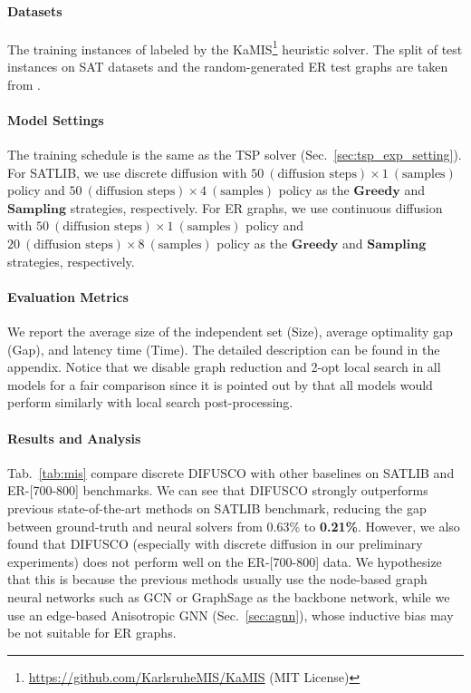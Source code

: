 \documentclass{article}
\theoremstyle{plain}
\theoremstyle{definition}
\theoremstyle{remark}
\newcommand{\method}{DIFUSCO}
\begin{document}
\paragraph{Datasets} The training instances of labeled by the KaMIS\footnote{\url{https://github.com/KarlsruheMIS/KaMIS} (MIT License)} heuristic solver. The split of test instances on SAT datasets and the random-generated ER test graphs are taken from \citet{qiudimes}.

\paragraph{Model Settings}
The training schedule is the same as the TSP solver (Sec.~\ref{sec:tsp_exp_setting}). For SATLIB, we use discrete diffusion with $50\ (\text{diffusion steps}) \times 1\ (\text{samples})$ policy and $50\ (\text{diffusion steps}) \times 4\ (\text{samples})$ policy as the $\textbf{Greedy}$ and $\textbf{Sampling}$ strategies, respectively. For ER graphs, we use continuous diffusion with $50\ (\text{diffusion steps})\times 1\ (\text{samples})$ policy and $20\ (\text{diffusion steps})\times 8\ (\text{samples})$ policy as the $\textbf{Greedy}$ and $\textbf{Sampling}$ strategies, respectively.

\paragraph{Evaluation Metrics}
We report the average size of the independent set (Size), average optimality gap (Gap), and latency time (Time). The detailed description can be found in the appendix.
Notice that we disable graph reduction and 2-opt local search in all models for a fair comparison since it is pointed out by \citep{other2022whats} that all models would perform similarly with local search post-processing.

\paragraph{Results and Analysis}

Tab.~\ref{tab:mis} compare discrete \method{} with other baselines on SATLIB and ER-[700-800] benchmarks. We can see that \method{} strongly outperforms previous state-of-the-art methods on SATLIB benchmark, reducing the gap between ground-truth and neural solvers
from 0.63\% to \textbf{0.21\%}. However, we also found that \method{} (especially with discrete diffusion in our preliminary experiments) does not perform well on the ER-[700-800] data. We hypothesize that this is because the previous methods usually use the node-based graph neural networks such as GCN \citep{kipf2017semisupervised} or GraphSage \citep{hamilton2017inductive} as the backbone network, while we use an edge-based Anisotropic GNN (Sec.~\ref{sec:agnn}), whose inductive bias may be not suitable for ER graphs.
\end{document}

